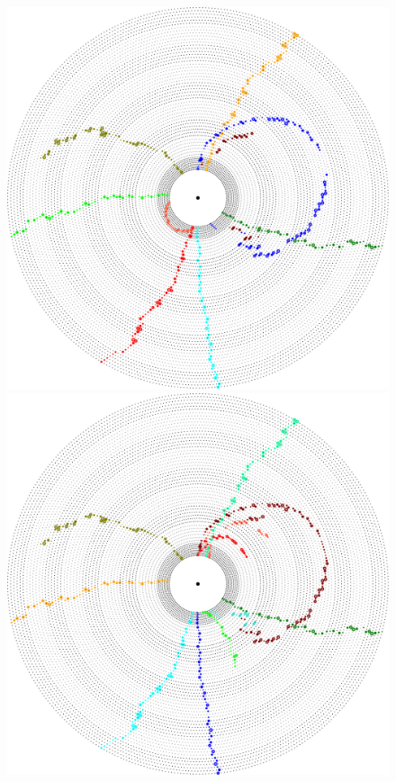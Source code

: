 \begin{figure}
  \centering
  \includegraphics[width=0.48\linewidth]{figures/workflow/event_display_finder.pdf}
  \includegraphics[width=0.48\linewidth]{figures/workflow/event_display_mc.pdf}
  \vspace*{0.5cm}
  

\end{figure}
